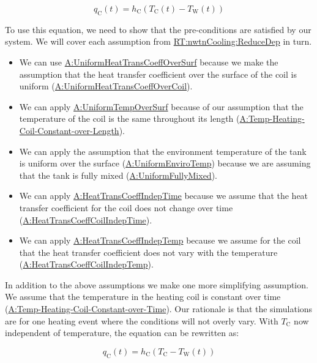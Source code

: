 \documentclass[12pt]{article}
\begin{document}
\begin{displaymath}
        {q_{\text{C}}}(t)={h_{\text{C}}} \left({T_{\text{C}}(t)}-{T_{\text{W}}}\left(t\right)\right)
\end{displaymath}

To use this equation, we need to show that the pre-conditions are satisfied by
our system.  We will cover each assumption from \hyperref[RT:nwtnCooling:ReduceDep]{RT:nwtnCooling:ReduceDep} in turn.

\begin{itemize}
\item We can use
\hyperref[assumpUnifHeatTransCoeff]{A:UniformHeatTransCoeffOverSurf} because we
make the assumption that the heat transfer coefficient over the surface of the
coil is uniform
(\hyperref[assumpUnifHeatTransCoeffCoil]{A:UniformHeatTransCoeffOverCoil}).
\item We can apply \hyperref[assumpUnifTempSurf]{A:UniformTempOverSurf} because
of our assumption that the temperature of the coil is the same throughout its
length (\hyperref[assumpTHCCoL]{A:Temp-Heating-Coil-Constant-over-Length}).
\item We can apply the assumption that the environment temperature of the tank
is uniform over the surface
(\hyperref[assumpUnifEnviroTempSurf]{A:UniformEnviroTemp}) because we are
assuming that the tank is fully mixed
(\hyperref[assumpFullyMixed]{A:UniformFullyMixed}).
\item We can apply
\hyperref[assumpHeatTransIndepTime]{A:HeatTransCoeffIndepTime} because we assume
that the heat transfer coefficient for the coil does not change over time
(\hyperref[assumpHeatTransCoilIndepTime]{A:HeatTransCoeffCoilIndepTime}).
\item We can apply
\hyperref[assumpHeatTransIndepTemp]{A:HeatTransCoeffIndepTemp} because we assume
for the coil that the heat transfer coefficient does not vary with the
temperature
(\hyperref[assumpHeatTransCoilIndepTemp]{A:HeatTransCoeffCoilIndepTemp}).
\end{itemize}

In addition to the above assumptions we make one more simplifying assumption. We
assume that the temperature in the heating coil is constant over time
(\hyperref[assumpTHCCoT]{A:Temp-Heating-Coil-Constant-over-Time}).  Our
rationale is that the simulations are for one heating event where the conditions
will not overly vary.  With $T_\text{C}$ now independent of temperature, the
equation can be rewritten as:

\begin{displaymath}
        {q_{\text{C}}}(t)={h_{\text{C}}} \left({T_{\text{C}}}-{T_{\text{W}}}\left(t\right)\right)
\end{displaymath}
\end{document}
